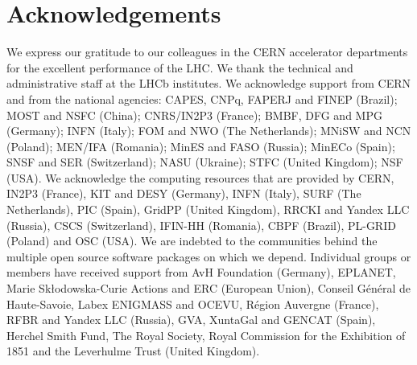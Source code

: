 \section*{Acknowledgements} 
\noindent We express our gratitude to our colleagues in the CERN
accelerator departments for the excellent performance of the LHC. We
thank the technical and administrative staff at the LHCb
institutes. We acknowledge support from CERN and from the national
agencies: CAPES, CNPq, FAPERJ and FINEP (Brazil); MOST and NSFC (China);
CNRS/IN2P3 (France); BMBF, DFG and MPG (Germany); INFN (Italy); 
FOM and NWO (The Netherlands); MNiSW and NCN (Poland); MEN/IFA (Romania); 
MinES and FASO (Russia); MinECo (Spain); SNSF and SER (Switzerland); 
NASU (Ukraine); STFC (United Kingdom); NSF (USA).
We acknowledge the computing resources that are provided by CERN, IN2P3 (France), KIT and DESY (Germany), INFN (Italy), SURF (The Netherlands), PIC (Spain), GridPP (United Kingdom), RRCKI and Yandex LLC (Russia), CSCS (Switzerland), IFIN-HH (Romania), CBPF (Brazil), PL-GRID (Poland) and OSC (USA). We are indebted to the communities behind the multiple open 
source software packages on which we depend.
Individual groups or members have received support from AvH Foundation (Germany),
EPLANET, Marie Sk\l{}odowska-Curie Actions and ERC (European Union), 
Conseil G\'{e}n\'{e}ral de Haute-Savoie, Labex ENIGMASS and OCEVU, 
R\'{e}gion Auvergne (France), RFBR and Yandex LLC (Russia), GVA, XuntaGal and GENCAT (Spain), Herchel Smith Fund, The Royal Society, Royal Commission for the Exhibition of 1851 and the Leverhulme Trust (United Kingdom).

